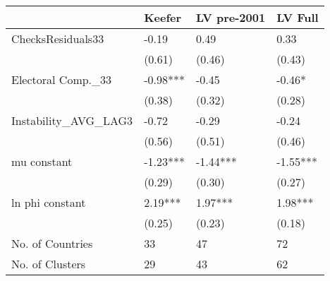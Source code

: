 \begin{tabular}{llll}
  \hline
 & Keefer & LV pre-2001 & LV Full \\ 
  \hline
ChecksResiduals33 & -0.19 & 0.49 & 0.33 \\ 
   & (0.61) & (0.46) & (0.43) \\ 
  Electoral Comp.\_33 & -0.98*** & -0.45 & -0.46* \\ 
   & (0.38) & (0.32) & (0.28) \\ 
  Instability\_AVG\_LAG3 & -0.72 & -0.29 & -0.24 \\ 
   & (0.56) & (0.51) & (0.46) \\ 
  mu constant & -1.23*** & -1.44*** & -1.55*** \\ 
   & (0.29) & (0.30) & (0.27) \\ 
  ln phi constant & 2.19*** & 1.97*** & 1.98*** \\ 
   & (0.25) & (0.23) & (0.18) \\ 
  No. of Countries & 33 & 47 & 72 \\ 
  No. of Clusters & 29 & 43 & 62 \\ 
   \hline
\end{tabular}
